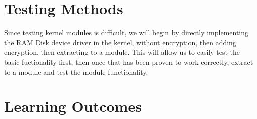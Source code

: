 \documentclass[letterpaper,10pt]{article}
\begin{document}
\section{Testing Methods}
Since testing kernel modules is difficult, we will begin by directly implementing the RAM Disk device 
driver in the kernel, without encryption, then adding encryption, then extracting to a module. 
This will allow us to easily test the basic fuctionality first, then once that has been proven to work 
correctly, extract to a module and test the module functionality.

\section{Learning Outcomes}
\end{document}

